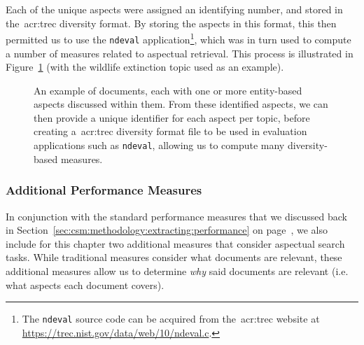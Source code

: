 Each of the unique aspects were assigned an identifying number, and stored in the~\gls{acr:trec} diversity format. By storing the aspects in this format, this then permitted us to use the \texttt{ndeval} application\footnote{The \texttt{ndeval} source code can be acquired from the~\gls{acr:trec} website at \url{https://trec.nist.gov/data/web/10/ndeval.c}. }, which was in turn used to compute a number of measures related to aspectual retrieval. This process is illustrated in Figure~\ref{fig:entity_ids} (with the wildlife extinction topic used as an example).

\begin{figure}[t!]
    \centering
    \caption[Entity-based aspects example]{An example of documents, each with one or more entity-based aspects discussed within them. From these identified aspects, we can then provide a unique identifier for each aspect per topic, before creating a~\gls{acr:trec} diversity format file to be used in evaluation applications such as \texttt{ndeval}, allowing us to compute many diversity-based measures.}
    \label{fig:entity_ids}
\end{figure}

\subsubsection{Additional Performance Measures}\label{sec:diversity:users:measures}
In conjunction with the standard performance measures that we discussed back in Section~\ref{sec:csm:methodology:extracting:performance} on page~\pageref{sec:csm:methodology:extracting:performance}, we also include for this chapter two additional measures that consider aspectual search tasks. While traditional measures consider what documents are relevant, these additional measures allow us to determine \emph{why} said documents are relevant (i.e. what aspects each document covers).

